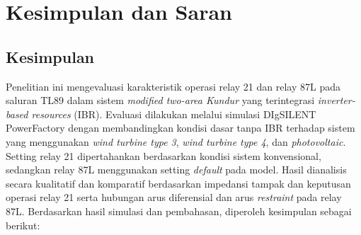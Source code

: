 \chapter{Kesimpulan dan Saran}

\section{Kesimpulan}

Penelitian ini mengevaluasi karakteristik operasi relay 21 dan relay 87L pada saluran TL89 dalam sistem \textit{modified two-area Kundur} yang terintegrasi \textit{inverter-based resources} (IBR). Evaluasi dilakukan melalui simulasi DIgSILENT PowerFactory dengan membandingkan kondisi dasar tanpa IBR terhadap sistem yang menggunakan \textit{wind turbine type 3}, \textit{wind turbine type 4}, dan \textit{photovoltaic}. Setting relay 21 dipertahankan berdasarkan kondisi sistem konvensional, sedangkan relay 87L menggunakan setting \textit{default} pada model. Hasil dianalisis secara kualitatif dan komparatif berdasarkan impedansi tampak dan keputusan operasi relay 21 serta hubungan arus diferensial dan arus \textit{restraint} pada relay 87L. Berdasarkan hasil simulasi dan pembahasan, diperoleh kesimpulan sebagai berikut:

